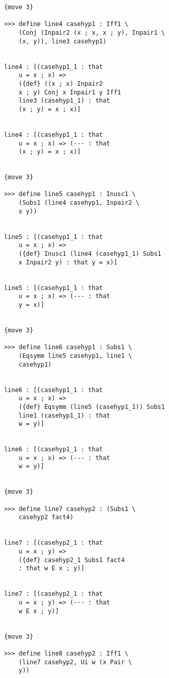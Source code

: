 \documentclass[12pt]{article}
\begin{document}
\begin{verbatim}
            {move 3}

            >>> define line4 casehyp1 : Iff1 \
                (Conj (Inpair2 (x ; x, x ; y), Inpair1 \
                (x, y)), line3 casehyp1)


            line4 : [(casehyp1_1 : that 
                u = x ; x) => 
                ({def} ((x ; x) Inpair2 
                x ; y) Conj x Inpair1 y Iff1 
                line3 (casehyp1_1) : that 
                (x ; y) = x ; x)]


            line4 : [(casehyp1_1 : that 
                u = x ; x) => (--- : that 
                (x ; y) = x ; x)]


            {move 3}

            >>> define line5 casehyp1 : Inusc1 \
                (Subs1 (line4 casehyp1, Inpair2 \
                x y))


            line5 : [(casehyp1_1 : that 
                u = x ; x) => 
                ({def} Inusc1 (line4 (casehyp1_1) Subs1 
                x Inpair2 y) : that y = x)]


            line5 : [(casehyp1_1 : that 
                u = x ; x) => (--- : that 
                y = x)]


            {move 3}

            >>> define line6 casehyp1 : Subs1 \
                (Eqsymm line5 casehyp1, line1 \
                casehyp1)


            line6 : [(casehyp1_1 : that 
                u = x ; x) => 
                ({def} Eqsymm (line5 (casehyp1_1)) Subs1 
                line1 (casehyp1_1) : that 
                w = y)]


            line6 : [(casehyp1_1 : that 
                u = x ; x) => (--- : that 
                w = y)]


            {move 3}

            >>> define line7 casehyp2 : (Subs1 \
                casehyp2 fact4)


            line7 : [(casehyp2_1 : that 
                u = x ; y) => 
                ({def} casehyp2_1 Subs1 fact4 
                : that w E x ; y)]


            line7 : [(casehyp2_1 : that 
                u = x ; y) => (--- : that 
                w E x ; y)]


            {move 3}

            >>> define line8 casehyp2 : Iff1 \
                (line7 casehyp2, Ui w (x Pair \
                y))



\end{verbatim}
\end{document}
